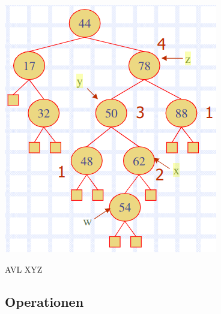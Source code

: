 \begin{minipage}[t]{0.4\textwidth}
				\centering
				\includegraphics[width=0.9\linewidth]{images/avl_xyz}
				\caption{AVL XYZ}
				\label{fig:AVL_XYZ}
			\end{minipage}
\clearpage

\subsection{Operationen}
